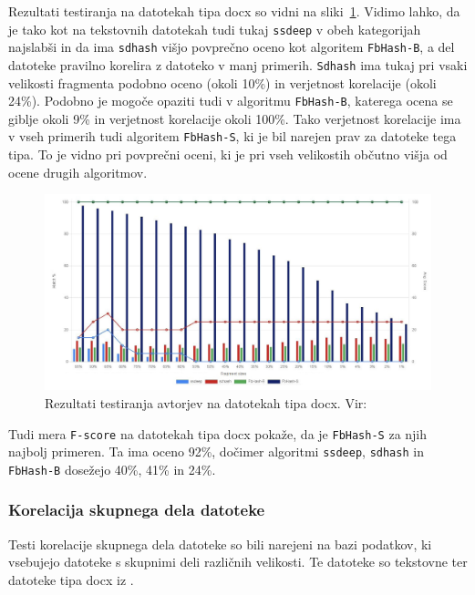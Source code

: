 \documentclass{acm_proc_article-sp}
\begin{document}
Rezultati testiranja na datotekah tipa docx so vidni na sliki~\ref{fig:fd-docx-rez}. Vidimo lahko, da je tako kot na tekstovnih datotekah tudi tukaj \texttt{ssdeep} v obeh kategorijah najslabši in da ima  \texttt{sdhash} višjo povprečno oceno kot algoritem \texttt{FbHash-B}, a del datoteke pravilno korelira z datoteko v manj primerih. \texttt{Sdhash} ima tukaj pri vsaki velikosti fragmenta podobno oceno (okoli 10\%) in verjetnost korelacije (okoli 24\%). Podobno je mogoče opaziti tudi v algoritmu \texttt{FbHash-B}, katerega ocena se giblje okoli 9\% in verjetnost korelacije okoli 100\%. Tako verjetnost korelacije ima v vseh primerih tudi algoritem \texttt{FbHash-S}, ki je bil narejen prav za datoteke tega tipa. To je vidno pri povprečni oceni, ki je pri vseh velikostih občutno višja od ocene drugih algoritmov.

\begin{figure}[htb]
\begin{center}
\includegraphics[width=1\columnwidth]{frag_det_docx.png}
\end{center}
\caption{\small{Rezultati testiranja avtorjev na datotekah tipa docx. Vir: \cite{fbhash}}}
\label{fig:fd-docx-rez}
\end{figure}

Tudi mera \texttt{F-score} na datotekah tipa docx pokaže, da je \texttt{FbHash-S} za njih najbolj primeren. Ta ima oceno 92\%, dočimer algoritmi \texttt{ssdeep}, \texttt{sdhash} in \texttt{FbHash-B} dosežejo 40\%, 41\% in 24\%.

\subsubsection{Korelacija skupnega dela datoteke}

Testi korelacije skupnega dela datoteke so bili narejeni na bazi podatkov, ki vsebujejo datoteke s skupnimi deli različnih velikosti. Te datoteke so tekstovne ter datoteke tipa docx iz \cite{zdataset}. 
\end{document}
